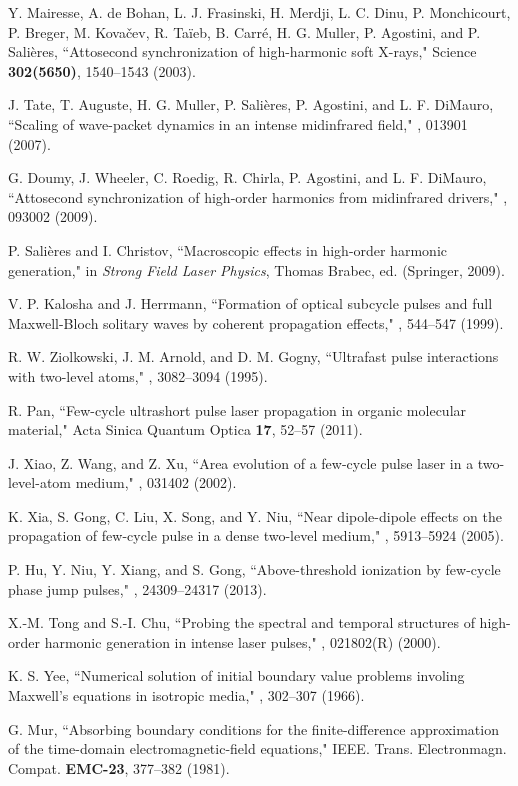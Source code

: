 \documentclass[10pt,letterpaper]{article}
\begin{document}
\begin{thebibliography}{99}
Y. Mairesse, A. de Bohan, L. J. Frasinski, H. Merdji, L. C. Dinu, P. Monchicourt, P. Breger, M. Kova\v{c}ev, R. Ta\"{i}eb, B. Carr\'{e}, H. G. Muller, P. Agostini, and P. Sali\`{e}res,  ``Attosecond synchronization of high-harmonic soft X-rays," Science {\bf 302(5650)}, 1540--1543 (2003).

J. Tate, T. Auguste, H. G. Muller, P. Sali\`{e}res, P. Agostini, and L. F. DiMauro, ``Scaling of wave-packet dynamics in an intense midinfrared field," , 013901 (2007).

G. Doumy, J. Wheeler, C. Roedig, R. Chirla, P. Agostini, and L. F. DiMauro, ``Attosecond synchronization of high-order harmonics from midinfrared drivers," , 093002 (2009).

P. Sali\`{e}res and I. Christov, ``Macroscopic effects in high-order harmonic generation," in \emph{Strong Field Laser Physics}, Thomas Brabec, ed. (Springer, 2009).

V. P. Kalosha and J. Herrmann, ``Formation of optical subcycle pulses and full Maxwell-Bloch solitary waves by coherent propagation effects," , 544--547 (1999).

R. W. Ziolkowski, J. M. Arnold, and D. M. Gogny, ``Ultrafast pulse interactions with two-level atoms," , 3082--3094 (1995).


R. Pan, ``Few-cycle ultrashort pulse laser propagation in organic molecular material," Acta Sinica Quantum Optica {\bf 17}, 52--57 (2011).

J. Xiao, Z. Wang, and Z. Xu, ``Area evolution of a few-cycle pulse laser in a two-level-atom medium," , 031402 (2002).

K. Xia, S. Gong, C. Liu, X. Song, and Y. Niu, ``Near dipole-dipole effects on the propagation of few-cycle pulse in a dense two-level medium," , 5913--5924 (2005).


P. Hu, Y. Niu, Y. Xiang, and S. Gong, ``Above-threshold ionization by few-cycle phase jump pulses," , 24309--24317 (2013).

X.-M. Tong and S.-I. Chu, ``Probing the spectral and temporal structures of high-order harmonic generation in intense laser pulses," , 021802(R) (2000).

K. S. Yee, ``Numerical solution of initial boundary value problems involing Maxwell's equations in isotropic media," , 302--307 (1966).

G. Mur, ``Absorbing boundary conditions for the finite-difference approximation of the time-domain electromagnetic-field equations," IEEE. Trans. Electronmagn. Compat. {\bf EMC-23}, 377--382 (1981).
	
\end{thebibliography}
\end{document}
